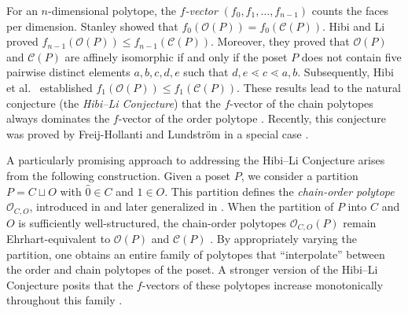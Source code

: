 \documentclass[12pt,a4paper]{amsart}
\renewcommand{\prec}{\lessdot}
\theoremstyle{definition}
\newcommand{\OP}{\mathcal{O}}
\newcommand{\CP}{\mathcal{C}}
\begin{document}
For an $n$-dimensional polytope, the \emph{$f$-vector} $(f_0, f_1, \dots, f_{n-1})$ counts the faces per dimension.
Stanley \cite[Theorem 3.2]{Sta86} showed that $f_0(\OP(P))=f_0(\CP(P))$.
Hibi and Li \cite{HL16} proved $f_{n-1}(\OP(P))\leq f_{n-1}(\CP(P))$.
Moreover, they proved that $\OP(P)$ and $\CP(P)$ are affinely isomorphic if and only if the poset $P$ does not contain five pairwise distinct elements $a,b,c,d,e$ such that $d,e \prec c \prec a,b$.
Subsequently, Hibi et al.\ \cite{HLSS17} established $f_1(\OP(P)) \leq f_1(\CP(P))$.
These results lead to the natural conjecture (the \emph{Hibi--Li Conjecture}) that the $f$-vector of the chain polytopes always dominates the $f$-vector of the order polytope \cite[Conjecture 2.4]{HL16}.
Recently, this conjecture was proved by Freij-Hollanti and Lundström in a special case \cite{freijhollanti2024fvector}.

A particularly promising approach to addressing the Hibi–Li Conjecture arises from the following construction.
Given a poset $P$, we consider a partition $P = C \sqcup O$ with $\hat{0} \in C$ and $\hat{1} \in O$.
This partition defines the \emph{chain-order polytope} $\OP_{C,O}$, introduced in \cite{FF16-Mark} and later generalized in \cite{FFLP, FFP20}.
When the partition of $P$ into $C$ and $O$ is sufficiently well-structured, the chain-order polytopes $\OP_{C,O}(P)$ remain Ehrhart-equivalent to $\OP(P)$ and $\CP(P)$ \cite[Theorem 3.1]{FF16-Mark}.
By appropriately varying the partition, one obtains an entire family of polytopes that \enquote{interpolate} between the order and chain polytopes of the poset.
A stronger version of the Hibi–Li Conjecture posits that the $f$-vectors of these polytopes increase monotonically throughout this family \cite{FF16-Mark}.
\end{document}
